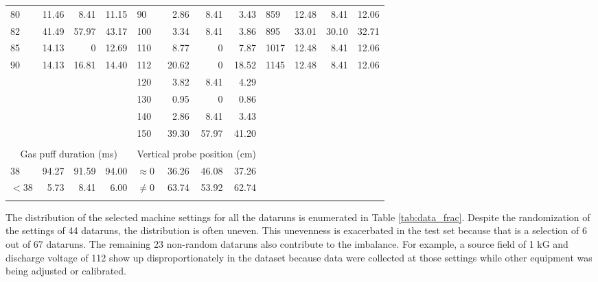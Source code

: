\begin{table}
\begin{tabular}{lrrr|lrrr|lrrr}
		80 & 11.46 & 8.41 & 11.15   & 90 & 2.86 & 8.41 & 3.43      & 859 & 12.48 & 8.41 & 12.06  \\
		82 & 41.49 & 57.97 & 43.17  & 100 & 3.34 & 8.41 & 3.86     & 895 & 33.01 & 30.10 & 32.71 \\
		85 & 14.13 & 0 & 12.69   & 110 & 8.77 & 0 & 7.87     & 1017 & 12.48 & 8.41 & 12.06 \\
		90 & 14.13 & 16.81 & 14.40  & 112 & 20.62 & 0 & 18.52   & 1145 & 12.48 & 8.41 & 12.06 \\
                      & & & & 120 & 3.82 & 8.41 & 4.29     &                       & & & \\
                      & & & & 130 & 0.95 & 0 & 0.86     &                       & & & \\
                      & & & & 140 & 2.86 & 8.41 & 3.43     &                       & & & \\
                      & & & & 150 & 39.30 & 57.97 & 41.20  &                       & & & \\
		\\
		\multicolumn{4}{c|}{Gas puff duration (ms)} & \multicolumn{4}{c}{Vertical probe position (cm)}\\
		\cline{0-7} \cline{0-7}
		$38$ & 94.27 & 91.59 & 94.00 & $\approx 0$ & 36.26 & 46.08 & 37.26 & \\
		$<38$ & 5.73 & 8.41 & 6.00    & $\neq 0$ & 63.74 & 53.92 & 62.74    & \\
		\multicolumn{12}{l}{}
	\end{tabular}
\end{table}


The distribution of the selected machine settings for all the dataruns is enumerated in Table \ref{tab:data_frac}. Despite the randomization of the settings of 44 dataruns, the distribution is often uneven. This unevenness is exacerbated in the test set because that is a selection of 6 out of 67 dataruns. The remaining 23 non-random dataruns also contribute to the imbalance. For example, a source field of 1 kG and discharge voltage of 112 show up disproportionately in the dataset because data were collected at those settings while other equipment was being adjusted or calibrated.


